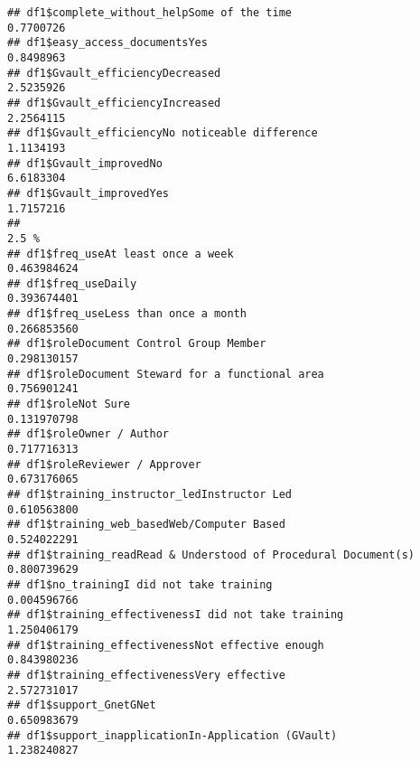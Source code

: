 \documentclass[
]{article}
\begin{document}
\begin{verbatim}
## df1$complete_without_helpSome of the time                                                     0.7700726
## df1$easy_access_documentsYes                                                                  0.8498963
## df1$Gvault_efficiencyDecreased                                                                2.5235926
## df1$Gvault_efficiencyIncreased                                                                2.2564115
## df1$Gvault_efficiencyNo noticeable difference                                                 1.1134193
## df1$Gvault_improvedNo                                                                         6.6183304
## df1$Gvault_improvedYes                                                                        1.7157216
##                                                                                                    2.5 %
## df1$freq_useAt least once a week                                                             0.463984624
## df1$freq_useDaily                                                                            0.393674401
## df1$freq_useLess than once a month                                                           0.266853560
## df1$roleDocument Control Group Member                                                        0.298130157
## df1$roleDocument Steward for a functional area                                               0.756901241
## df1$roleNot Sure                                                                             0.131970798
## df1$roleOwner / Author                                                                       0.717716313
## df1$roleReviewer / Approver                                                                  0.673176065
## df1$training_instructor_ledInstructor Led                                                    0.610563800
## df1$training_web_basedWeb/Computer Based                                                     0.524022291
## df1$training_readRead & Understood of Procedural Document(s)                                 0.800739629
## df1$no_trainingI did not take training                                                       0.004596766
## df1$training_effectivenessI did not take training                                            1.250406179
## df1$training_effectivenessNot effective enough                                               0.843980236
## df1$training_effectivenessVery effective                                                     2.572731017
## df1$support_GnetGNet                                                                         0.650983679
## df1$support_inapplicationIn-Application (GVault)                                             1.238240827

\end{verbatim}
\end{document}
